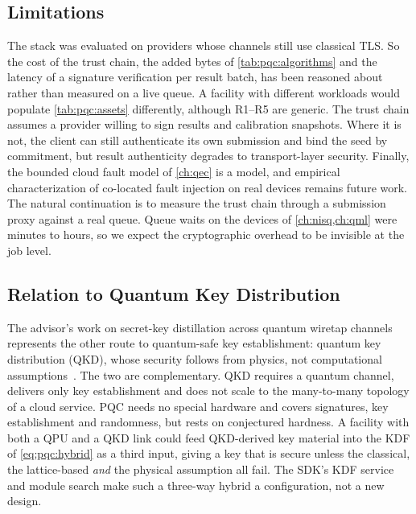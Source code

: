 \subsection{Limitations}\label{sec:pqc:limitations}

The stack was evaluated on providers whose channels still use classical TLS. So the cost of the trust chain, the added bytes of \cref{tab:pqc:algorithms} and the latency of a signature verification per result batch, has been reasoned about rather than measured on a live queue. A facility with different workloads would populate \cref{tab:pqc:assets} differently, although R1--R5 are generic. The trust chain assumes a provider willing to sign results and calibration snapshots. Where it is not, the client can still authenticate its own submission and bind the seed by commitment, but result authenticity degrades to transport-layer security. Finally, the bounded cloud fault model of \cref{ch:qec} is a model, and empirical characterization of co-located fault injection on real devices remains future work. The natural continuation is to measure the trust chain through a submission proxy against a real queue. Queue waits on the devices of \cref{ch:nisq,ch:qml} were minutes to hours, so we expect the cryptographic overhead to be invisible at the job level.

\subsection{Relation to Quantum Key Distribution}\label{sec:pqc:qkd}

The advisor's work on secret-key distillation across quantum wiretap channels~\cite{pan2020secretkey} represents the other route to quantum-safe key establishment: quantum key distribution (QKD), whose security follows from physics, not computational assumptions~\cite{bennett1984bb84,vazirani2014diqkd}. The two are complementary. QKD requires a quantum channel, delivers only key establishment and does not scale to the many-to-many topology of a cloud service. PQC needs no special hardware and covers signatures, key establishment and randomness, but rests on conjectured hardness. A facility with both a QPU and a QKD link could feed QKD-derived key material into the KDF of \cref{eq:pqc:hybrid} as a third input, giving a key that is secure unless the classical, the lattice-based \emph{and} the physical assumption all fail. The SDK's KDF service and module search make such a three-way hybrid a configuration, not a new design.

